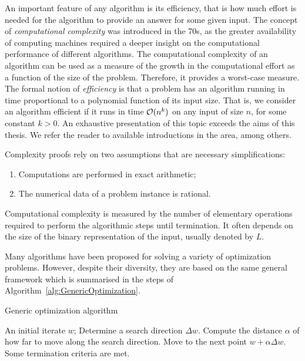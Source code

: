 An important feature of any algorithm is its efficiency, that is 
how much effort is needed for the algorithm to provide an answer
for some given input.
The concept of {\em computational complexity} was introduced in the 70s,
as the greater availability of computing machines required a deeper insight
on the computational performance of different algorithms.
The computational complexity of an algorithm can be used as a measure
of the growth in the computational effort
as a function of the size of the problem. Therefore, it provides 
a worst-case measure.
The formal notion of {\em efficiency} is that a problem has an 
algorithm running in time proportional to a polynomial function 
of its input size. That is, we consider an algorithm efficient
 if it runs in time $\mathcal{O}(n^k)$ on any input of size $n$, 
for some constant $k>0$.
An exhaustive presentation of this topic exceeds the aims of this thesis.
We refer the reader to available introductions in the area, 
\cite[Chapter~2]{Schrijver86} among others.

Complexity proofs rely on two assumptions that are necessary 
simplifications:
\begin{enumerate}
\item Computations are performed in exact arithmetic;
\item The numerical data of a problem instance is rational.
\end{enumerate}

Computational complexity is measured by the number of elementary operations
required to perform the algorithmic steps until termination. It often depends 
on the size of the binary representation of the input,
usually denoted by $L$.

Many algorithms have been proposed for solving a variety of optimization
problems. However, despite their diversity, they are based on the same 
general framework which is summarised in the steps of 
Algorithm~\ref{alg:GenericOptimization}.

\renewcommand{\algorithmicrequire}{\textbf{Given:}}
\renewcommand{\algorithmicrepeat}{\textbf{Repeat:}}
\renewcommand{\algorithmicuntil}{\textbf{Until}}
\begin{algorithm}[ht]
  \caption{Generic optimization algorithm}
    \begin{algorithmic}  \label{alg:GenericOptimization}
      \REQUIRE An initial iterate $w$;
      \smallskip
      \REPEAT
         \STATE Determine a search direction $\Delta w$.
         \smallskip
         \STATE Compute the distance $\alpha$ of how far to move along
	        the search direction.
         \smallskip
         \STATE Move to the next point $w + \alpha\Delta w$.
         \smallskip
      \UNTIL Some termination criteria are met.
  \end{algorithmic}
\end{algorithm}

